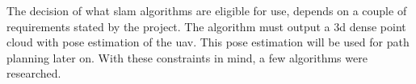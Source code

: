 The decision of what \acs{slam} algorithms are eligible for use, depends on a couple of requirements stated by the project. The algorithm must output a \acs{3d} dense point cloud with pose estimation of the \acs{uav}. This pose estimation will be used for path planning later on. With these constraints in mind, a few algorithms were researched.